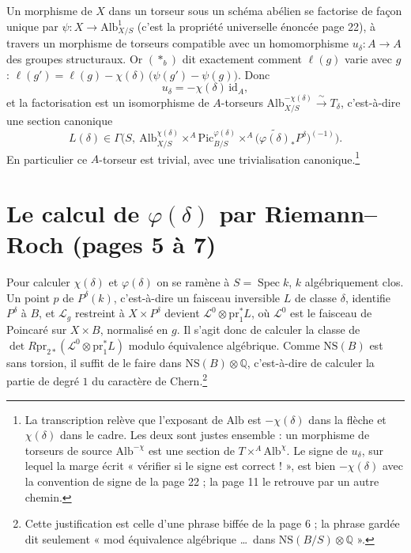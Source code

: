 \documentclass[11pt,a4paper]{article}
\begin{document}
Un morphisme de $X$ dans un torseur sous un schéma abélien se factorise de
façon unique par $\psi : X \to \mathrm{Alb}^{1}_{X/S}$ (c'est la propriété
universelle énoncée page 22), à travers un morphisme de torseurs compatible
avec un homomorphisme $u_{\delta} : A \to A$ des groupes structuraux. Or
$(*_{b})$ dit exactement comment $\ell(g)$ varie avec $g$ :
$\ell(g') = \ell(g) - \chi(\delta)\,\bigl(\psi(g') - \psi(g)\bigr)$. Donc
\[
u_{\delta} = -\chi(\delta)\,\mathrm{id}_A ,
\]
et la factorisation est un isomorphisme de $A$-torseurs
$\mathrm{Alb}^{-\chi(\delta)}_{X/S} \xrightarrow{\ \sim\ } T_{\delta}$,
c'est-à-dire une section canonique
\[
\boxed{\;L(\delta) \in \Gamma\bigl(S,\ \mathrm{Alb}^{\chi(\delta)}_{X/S}
\times^{A} \mathrm{Pic}^{\varphi(\delta)}_{B/S} \times^{A}
\bigl(\widetilde{\varphi(\delta)}_{*}P^{\delta}\bigr)^{(-1)}\bigr).\;}
\]
En particulier ce $A$-torseur est trivial, avec une trivialisation
canonique.\footnote{La transcription relève que l'exposant de $\mathrm{Alb}$
est $-\chi(\delta)$ dans la flèche et $\chi(\delta)$ dans le cadre. Les deux
sont justes ensemble : un morphisme de torseurs de source
$\mathrm{Alb}^{-\chi}$ est une section de $T \times^{A} \mathrm{Alb}^{\chi}$.
Le signe de $u_{\delta}$, sur lequel la marge écrit « vérifier si le signe est
correct ! », est bien $-\chi(\delta)$ avec la convention de signe de la
page 22 ; la page 11 le retrouve par un autre chemin.}

\section*{Le calcul de $\varphi(\delta)$ par Riemann--Roch (pages 5 à 7)}

Pour calculer $\chi(\delta)$ et $\varphi(\delta)$ on se ramène à
$S = \operatorname{Spec} k$, $k$ algébriquement clos. Un point $p$ de
$P^{\delta}(k)$, c'est-à-dire un faisceau inversible $L$ de classe $\delta$,
identifie $P^{\delta}$ à $B$, et $\mathcal{L}_g$ restreint à $X \times
P^{\delta}$ devient $\mathcal{L}^{0} \otimes \mathrm{pr}_1^{*}L$, où
$\mathcal{L}^{0}$ est le faisceau de Poincaré sur $X \times B$, normalisé en
$g$. Il s'agit donc de calculer la classe de $\det R\mathrm{pr}_{2*}
(\mathcal{L}^{0} \otimes \mathrm{pr}_1^{*}L)$ modulo équivalence algébrique.
Comme $\mathrm{NS}(B)$ est sans torsion, il suffit de le faire dans
$\mathrm{NS}(B) \otimes \mathbb{Q}$, c'est-à-dire de calculer la partie de
degré $1$ du caractère de Chern.\footnote{Cette justification est celle d'une
phrase biffée de la page 6 ; la phrase gardée dit seulement « mod équivalence
algébrique \ldots\ dans $\mathrm{NS}(B/S) \otimes \mathbb{Q}$ ».}
\end{document}

